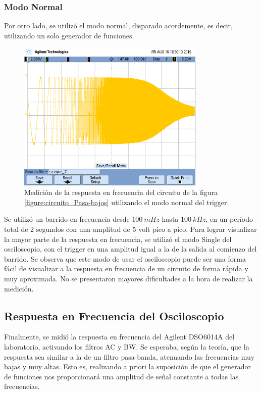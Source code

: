 \documentclass[a4paper]{article}
\begin{document}
\subsubsection*{Modo Normal}
Por otro lado, se utilizó el modo normal, disparado acordemente, es decir, utilizando un solo generador de funciones.
\begin{figure}[H]
	\centering
	\includegraphics[width=0.8\textwidth,trim={0.6cm 7cm  1 5cm},clip]{ej3normal.png}
	\caption{Medición de la respuesta en frecuencia del circuito de la figura \ref{figure:circuito_Pasa-bajos} utilizando el modo normal del trigger.} 
	\label{graf:ej3modonormal}
\end{figure}
Se utilizó un barrido en frecuencia desde $100 \ mHz$ hasta $100 \ kHz$, en un período total de 2 segundos con una amplitud de 5 volt pico a pico. Para lograr visualizar la mayor parte de la respuesta en frecuencia, se utilizó el modo Single del osciloscopio, con el trigger en una amplitud igual a la de la salida al comienzo del barrido. Se observa que este modo de usar el osciloscopio puede ser una forma fácil de visualizar a la respuesta en frecuencia de un circuito de forma rápida y muy aproximada. No se presentaron mayores dificultades a la hora de realizar la medición.

\subsection*{Respuesta en Frecuencia del Osciloscopio}
Finalmente, se midió la respuesta en frecuencia del Agilent DSO6014A del laboratorio, activando los filtros AC y BW. Se esperaba, según la teoría, que la respuesta sea similar a la de un filtro pasa-banda, atenuando las frecuencias muy bajas y muy altas. Esto es, realizando a priori la suposición de que el generador de funciones nos proporcionará una amplitud de señal constante a todas las frecuencias.
\end{document}

